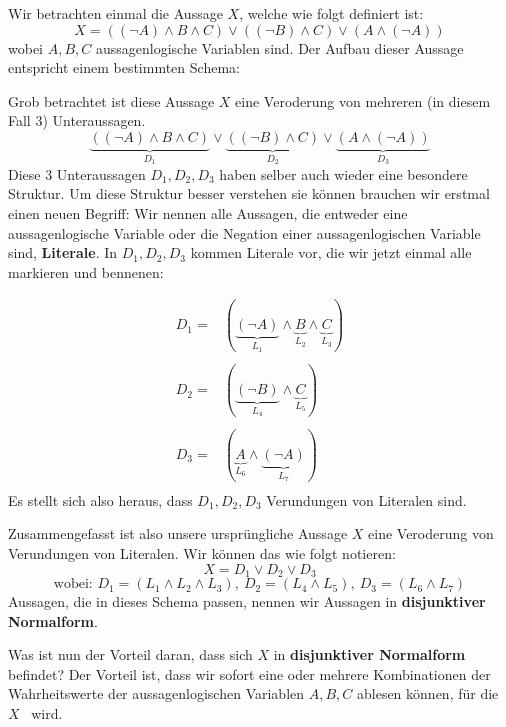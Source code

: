 \documentclass[../../main.tex]{subfiles}
\begin{document}
    \begin{example}{}
        Wir betrachten einmal die Aussage $X$, welche wie folgt definiert ist:
        \[X = ((\lnot A) \land B \land C) \lor ((\lnot B) \land  C) 
        \lor (A \land (\lnot A))\]
        wobei $A,B,C$ aussagenlogische Variablen sind.
        Der Aufbau dieser Aussage entspricht einem bestimmten Schema:

        Grob betrachtet ist diese Aussage $X$ eine Veroderung von 
        mehreren (in diesem Fall 3) Unteraussagen.
        \[\underbrace{((\lnot A) \land B \land C)}_{D_1} \lor \underbrace{((\lnot B) \land 
        C)}_{D_2} \lor \underbrace{(A \land (\lnot A))}_{D_3}\]
        Diese 3 Unteraussagen $D_1,D_2,D_3$ haben selber auch wieder eine besondere Struktur.
        Um diese Struktur besser verstehen sie können brauchen wir erstmal einen neuen Begriff:
        Wir nennen alle Aussagen, die entweder eine aussagenlogische Variable 
        oder die Negation einer
        aussagenlogischen Variable sind, \textbf{Literale}.       
        In $D_1,D_2,D_3$ kommen Literale vor, die wir jetzt
        einmal alle markieren und bennenen:

        \[\begin{array}{cc}
            D_1 = & (\underbrace{(\lnot A)}_{L_1} \land \underbrace{B}_{L_2} \land 
            \underbrace{C}_{L_3})  \\
            \\
            D_2 = & (\underbrace{(\lnot B)}_{L_4} \land \underbrace{C}_{L_5}) \\ \\
            D_3 = & (\underbrace{A}_{L_6} \land \underbrace{(\lnot A)}_{L_7}) \\
        \end{array}\]
        Es stellt sich also heraus, dass 
        $D_1,D_2,D_3$ Verundungen von Literalen sind.

        Zusammengefasst ist also unsere ursprüngliche Aussage $X$
        eine Veroderung von Verundungen von
        Literalen. Wir können das wie folgt notieren:
        \[X = D_1 \lor D_2 \lor D_3\]
        \[\textrm{wobei: }D_1 = (L_1 \land L_2 \land L_3),\  D_2 = (L_4 
        \land L_5),\  D_3 = (L_6 \land L_7)\]
        Aussagen, die in dieses Schema passen, nennen wir 
        Aussagen in \textbf{disjunktiver Normalform}.

        Was ist nun der Vorteil daran, dass sich $X$ in
        \textbf{disjunktiver Normalform}
        befindet? Der Vorteil ist, dass wir sofort eine oder mehrere Kombinationen der 
        Wahrheitswerte der
        aussagenlogischen Variablen $A,B,C$ ablesen können, für 
        die $X$ \wahr\ wird. 


\end{example}
\end{document}
